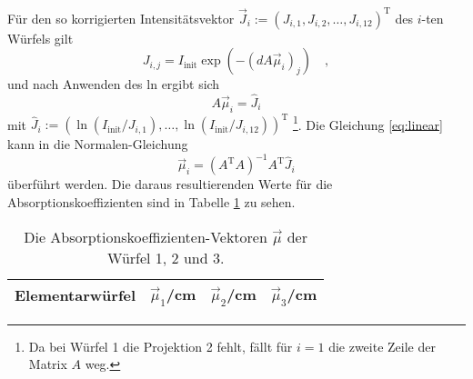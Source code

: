 Für den so korrigierten Intensitätsvektor $\vec{J}_i:=(J_{i,1},J_{i,2},\ldots,J_{i,12})^\text{T}$ 
des $i$-ten Würfels gilt
\begin{equation}
J_{i,j}=I_\text{init}\exp\left(- (d A \vec{\mu}_i)_j \right) \quad ,
\end{equation}
und nach Anwenden des ln ergibt sich
\begin{equation}
A \vec{\mu}_i = \hat{J}_i \label{eq:linear}
\end{equation}
mit $\hat{J}_i:=(\ln(I_\text{init}/J_{i,1}),\ldots,\ln(I_\text{init}/J_{i,12}))^\text{T}$ 
  \footnote{
Da bei Würfel 1 die Projektion 2 fehlt, fällt für $i=1$ die zweite Zeile der Matrix $A$ weg.}. 
Die Gleichung \eqref{eq:linear} kann in die Normalen-Gleichung
\begin{equation}
\vec{\mu}_i = \left( A^\text{T}A \right)^{-1} A^\text{T} \hat{J}_i \label{eq:linear2}
\end{equation}
überführt werden. Die daraus resultierenden Werte für die Absorptionskoeffizienten sind in 
Tabelle \ref{tab:Koeff} zu sehen.
\begin{table}[h]
\centering
\begin{tabular}{cccc}
\toprule
\midrule
Elementarwürfel & $\vec{\mu}_1$/cm & $\vec{\mu}_2$/cm & $\vec{\mu}_3$/cm \\
\midrule

\midrule
\bottomrule
\end{tabular}
\caption{Die Absorptionskoeffizienten-Vektoren $\vec{\mu}$ der Würfel 1, 2 und 3.}
\label{tab:Koeff}
\end{table}
\clearpage
